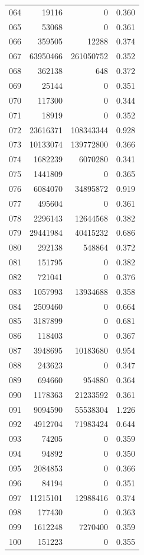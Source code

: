 \documentclass[anonymous,notoc]{gmcm2026}
\begin{document}
\begin{longtable}{lrrr}
064 & 19116 & 0 & 0.360 \\
065 & 53068 & 0 & 0.361 \\
066 & 359505 & 12288 & 0.374 \\
067 & 63950466 & 261050752 & 0.352 \\
068 & 362138 & 648 & 0.372 \\
069 & 25144 & 0 & 0.351 \\
070 & 117300 & 0 & 0.344 \\
071 & 18919 & 0 & 0.352 \\
072 & 23616371 & 108343344 & 0.928 \\
073 & 10133074 & 139772800 & 0.366 \\
074 & 1682239 & 6070280 & 0.341 \\
075 & 1441809 & 0 & 0.365 \\
076 & 6084070 & 34895872 & 0.919 \\
077 & 495604 & 0 & 0.361 \\
078 & 2296143 & 12644568 & 0.382 \\
079 & 29441984 & 40415232 & 0.686 \\
080 & 292138 & 548864 & 0.372 \\
081 & 151795 & 0 & 0.382 \\
082 & 721041 & 0 & 0.376 \\
083 & 1057993 & 13934688 & 0.358 \\
084 & 2509460 & 0 & 0.664 \\
085 & 3187899 & 0 & 0.681 \\
086 & 118403 & 0 & 0.367 \\
087 & 3948695 & 10183680 & 0.954 \\
088 & 243623 & 0 & 0.347 \\
089 & 694660 & 954880 & 0.364 \\
090 & 1178363 & 21233592 & 0.361 \\
091 & 9094590 & 55538304 & 1.226 \\
092 & 4912704 & 71983424 & 0.644 \\
093 & 74205 & 0 & 0.359 \\
094 & 94892 & 0 & 0.350 \\
095 & 2084853 & 0 & 0.366 \\
096 & 84194 & 0 & 0.351 \\
097 & 11215101 & 12988416 & 0.374 \\
098 & 177430 & 0 & 0.363 \\
099 & 1612248 & 7270400 & 0.359 \\
100 & 151223 & 0 & 0.355 \\
\end{longtable}
\end{document}
